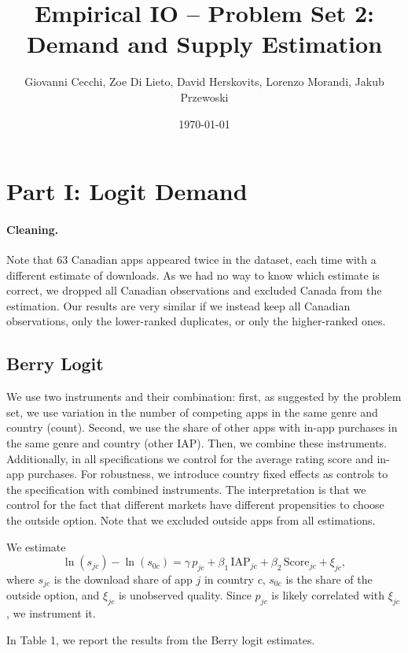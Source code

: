 \documentclass{article}
\title{Empirical IO -- Problem Set 2: Demand and Supply Estimation}
\author{Giovanni Cecchi, Zoe Di Lieto, David Herskovits, Lorenzo Morandi, Jakub Przewoski}
\date{\today}
\begin{document}
\maketitle
\vspace{-4em}

\section{Part I: Logit Demand}
\paragraph{Cleaning.} Note that 63 Canadian apps appeared twice in the dataset, each time with a different estimate of downloads. As we had no way to know which estimate is correct, we dropped all Canadian observations and excluded Canada from the estimation. Our results are very similar if we instead keep all Canadian observations, only the lower-ranked duplicates, or only the higher-ranked ones.
\subsection{Berry Logit}

We use two instruments and their combination: first, as suggested by the problem set, we use variation in the number of competing apps in the same genre and country (count). Second, we use the share of other apps with in-app purchases in the same genre and country (other IAP). Then, we combine these instruments. Additionally, in all specifications we control for the average rating score and in-app purchases. For robustness, we introduce country fixed effects as controls to the specification with combined instruments. The interpretation is that we control for the fact that different markets have different propensities to choose the outside option. Note that we excluded outside apps from all estimations.

We estimate
\begin{equation}
\ln(s_{jc}) - \ln(s_{0c}) = \gamma\, p_{jc} + \beta_1\, \text{IAP}_{jc} + \beta_2\, \text{Score}_{jc} + \xi_{jc},
\end{equation}
where $s_{jc}$ is the download share of app $j$ in country $c$, $s_{0c}$ is the share of the outside option, and $\xi_{jc}$ is unobserved quality. Since $p_{jc}$ is likely correlated with $\xi_{jc}$, we instrument it.

In Table 1, we report the results from the Berry logit estimates.
\end{document}

